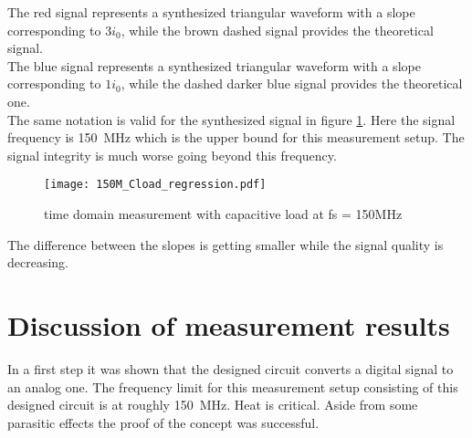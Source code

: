 The red signal represents a synthesized triangular waveform with a slope corresponding to $3 i_0$, while the brown dashed signal provides the theoretical signal.\\
The blue signal represents a synthesized triangular waveform with a slope corresponding to $1 i_0$, while the dashed darker blue signal provides the theoretical one.\\
The same notation is valid for the synthesized signal in figure \ref{fig:measCload150M}.
Here the signal frequency is \SI{150}{\mega \hertz} which is the upper bound for this measurement setup.
The signal integrity is much worse going beyond this frequency.

\begin{figure}[htb!]
	\centering
  \texttt{[image: 150M\_Cload\_regression.pdf]}
	\caption{time domain measurement with capacitive load at fs = 150MHz}
	\label{fig:measCload150M}
\end{figure}


The difference between the slopes is getting smaller while the signal quality is decreasing.


\section{Discussion of measurement results}
In a first step it was shown that the designed circuit converts a digital signal to an analog one.
The frequency limit for this measurement setup consisting of this designed circuit is at roughly \SI{150}{\mega \hertz}.
Heat is critical. 
Aside from some parasitic effects the proof of the concept was successful.


